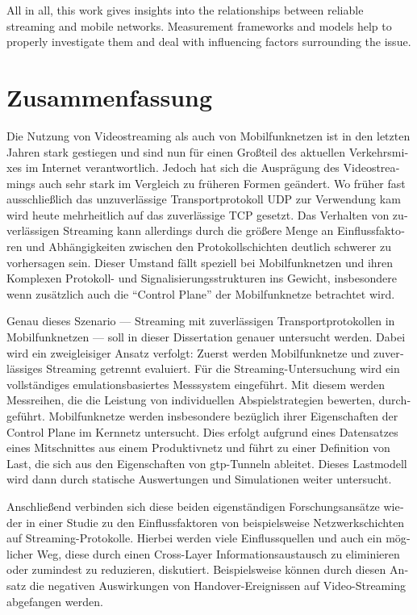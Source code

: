 All in all, this work gives insights into the relationships between reliable streaming and mobile networks. Measurement frameworks and models help to properly investigate them and deal with influencing factors surrounding the issue.


\chapter*{Zusammenfassung}
\begin{german}
Die Nutzung von Videostreaming als auch von Mobilfunknetzen ist in den letzten Jahren stark gestiegen und sind nun für einen Großteil des aktuellen Verkehrsmixes im Internet verantwortlich. Jedoch hat sich die Ausprägung des Videostreamings auch sehr stark im Vergleich zu früheren Formen geändert. Wo früher fast ausschließlich das unzuverlässige Transportprotokoll \acrshort{UDP} zur Verwendung kam wird heute mehrheitlich auf das zuverlässige \acrshort{TCP} gesetzt. Das Verhalten von zuverlässigen Streaming kann allerdings durch die größere Menge an Einflussfaktoren und Abhängigkeiten zwischen den Protokollschichten deutlich schwerer zu vorhersagen sein. Dieser Umstand fällt speziell bei Mobilfunknetzen und ihren Komplexen Protokoll- und Signalisierungsstrukturen ins Gewicht, insbesondere wenn zusätzlich auch die ``Control Plane'' der Mobilfunknetze betrachtet wird.

Genau dieses Szenario --- Streaming mit zuverlässigen Transportprotokollen in Mobilfunknetzen --- soll in dieser Dissertation genauer untersucht werden. Dabei wird ein zweigleisiger Ansatz verfolgt: Zuerst werden Mobilfunknetze und zuverlässiges Streaming getrennt evaluiert. Für die Streaming-Untersuchung wird ein vollständiges emulationsbasiertes Messsystem eingeführt. Mit diesem werden Messreihen, die die Leistung von individuellen Abspielstrategien bewerten, durchgeführt. Mobilfunknetze werden insbesondere bezüglich ihrer Eigenschaften der Control Plane im Kernnetz untersucht. Dies erfolgt aufgrund eines Datensatzes eines Mitschnittes aus einem Produktivnetz und führt zu einer Definition von Last, die sich aus den Eigenschaften von \acrshort{gtp}-Tunneln ableitet. Dieses Lastmodell wird dann durch statische Auswertungen und Simulationen weiter untersucht.

Anschließend verbinden sich diese beiden eigenständigen Forschungsansätze wieder in einer Studie zu den Einflussfaktoren von beispielsweise Netzwerkschichten auf Streaming-Protokolle. Hierbei werden viele Einflussquellen und auch ein möglicher Weg, diese durch einen Cross-Layer Informationsaustausch zu eliminieren oder zumindest zu reduzieren, diskutiert. Beispielsweise können durch diesen Ansatz die negativen Auswirkungen von Handover-Ereignissen auf Video-Streaming abgefangen werden.


\end{german}
